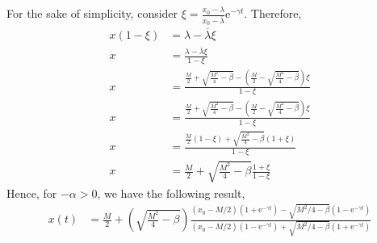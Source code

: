 For the sake of simplicity, consider $\xi=\frac{x_0-\lambda}{x_0-\overline{\lambda}}\mathrm{e}^{-\gamma t}$. Therefore,
\begin{align*}
	x\left(1-\xi\right)&=\lambda-\overline{\lambda}\xi\\
	x&=\frac{\lambda-\overline{\lambda}\xi}{1-\xi} \\	
	x&=\frac{\frac{M}{2}+\sqrt{\frac{M^2}{4}-\beta}-\left(\frac{M}{2}-\sqrt{\frac{M^2}{4}-\beta}\right)\xi}{1-\xi}\\
	x&=\frac{\frac{M}{2}+\sqrt{\frac{M^2}{4}-\beta}-\left(\frac{M}{2}-\sqrt{\frac{M^2}{4}-\beta}\right)\xi}{1-\xi}\\
	x&=\frac{\frac{M}{2}\left(1-\xi\right)+\sqrt{\frac{M^2}{4}-\beta}\left(1+\xi\right)}{1-\xi}\\
	x&=\frac{M}{2}+\sqrt{\frac{M^2}{4}-\beta}\frac{1+\xi}{1-\xi}
\end{align*}
Hence, for $-\alpha>0$, we have the following result,
\begin{align}
	x(t)&=\frac{M}{2}+\left(\sqrt{\frac{M^2}{4}-\beta}\right)\frac{\left(x_0-M/2\right)\left(1+\mathrm e^{-\gamma t}\right)-\sqrt{M^2/4-\beta}\left(1-\mathrm{e}^{-\gamma t}\right)}{\left(x_0-M/2\right)\left(1-\mathrm e^{-\gamma t}\right)+\sqrt{M^2/4-\beta}\left(1+\mathrm{e}^{-\gamma t}\right)} \label{eq: Time Expression for Harvest}
\end{align}

